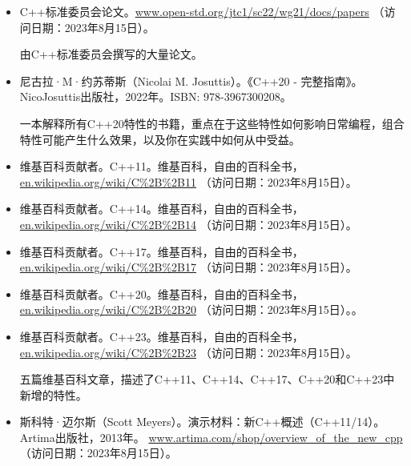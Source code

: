 
\begin{itemize}
\item
C++标准委员会论文。\url{www.open-std.org/jtc1/sc22/wg21/docs/papers} （访问日期：2023年8月15日）。

\hspace*{\fill}

由C++标准委员会撰写的大量论文。

\hspace*{\fill}

\item
尼古拉·M·约苏蒂斯（Nicolai M. Josuttis）。《C++20 - 完整指南》。NicoJosuttis出版社，2022年。ISBN: 978-3967300208。

\hspace*{\fill}

一本解释所有C++20特性的书籍，重点在于这些特性如何影响日常编程，组合特性可能产生什么效果，以及你在实践中如何从中受益。

\hspace*{\fill}

\item
维基百科贡献者。C++11。维基百科，自由的百科全书，\url{en.wikipedia.org/wiki/C%2B%2B11} （访问日期：2023年8月15日）。

\item
维基百科贡献者。C++14。维基百科，自由的百科全书，\url{en.wikipedia.org/wiki/C%2B%2B14} （访问日期：2023年8月15日）。

\item
维基百科贡献者。C++17。维基百科，自由的百科全书，\url{en.wikipedia.org/wiki/C%2B%2B17} （访问日期：2023年8月15日）。

\item
维基百科贡献者。C++20。维基百科，自由的百科全书，\url{en.wikipedia.org/wiki/C%2B%2B20} （访问日期：2023年8月15日）。。

\item
维基百科贡献者。C++23。维基百科，自由的百科全书，\url{en.wikipedia.org/wiki/C%2B%2B23} （访问日期：2023年8月15日）。

\hspace*{\fill}

五篇维基百科文章，描述了C++11、C++14、C++17、C++20和C++23中新增的特性。

\hspace*{\fill}

\item
斯科特·迈尔斯（Scott Meyers）。演示材料：新C++概述（C++11/14）。Artima出版社，2013年。 \url{www.artima.com/shop/overview_of_the_new_cpp} （访问日期：2023年8月15日）。


\end{itemize}
